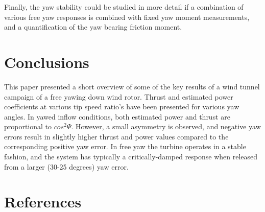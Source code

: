 \documentclass[a4paper]{jpconf}
\begin{document}
Finally, the yaw stability could be studied in more detail if a combination of various free yaw responses is combined with fixed yaw moment measurements, and a quantification of the yaw bearing friction moment.

\section{Conclusions}

This paper presented a short overview of some of the key results of a wind tunnel campaign of a free yawing down wind rotor. Thrust and estimated power coefficients at various tip speed ratio's have been presented for various yaw angles. In yawed inflow conditions, both estimated power and thrust are proportional to $cos^2 \Psi $. However, a small asymmetry is observed, and negative yaw errors result in slightly higher thrust and power values compared to the corresponding positive yaw error. In free yaw the turbine operates in a stable fashion, and the system has typically a critically-damped response when released from a larger (30-25 degrees) yaw error.



\section*{References}

\begingroup
\raggedright
%



%
%
%
%
%

\endgroup
\end{document}
